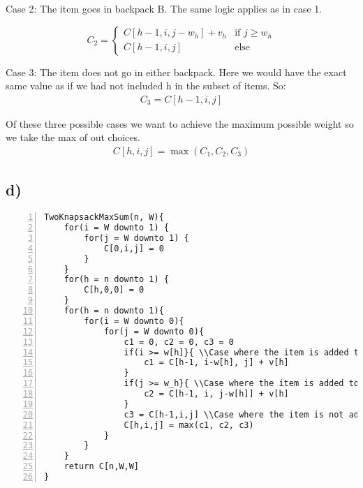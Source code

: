 \documentclass[12pt]{article}
\begin{document}
Case 2: The item goes in backpack B. The same logic applies as in case 1.
\begin{center}
\[
 C_2 =
  \begin{cases}
   C[h-1, i, j - w_h]  + v_h & \text{if } j \geq w_h \\
   C[h-1, i, j]       & \text{else}
  \end{cases}
\]
\end{center}

Case 3: The item does not go in either backpack. Here we would have the exact same value as if we had not included h in the subset of items. So:
\begin{eqnarray*}
    C_3 = C[h -1,i,j]
\end{eqnarray*}

Of these three possible cases we want to achieve the maximum possible weight so we take the max of out choices.
\begin{eqnarray*}
    C[h,i,j] = \max(C_1, C_2, C_3)
\end{eqnarray*}

\subsection*{d)}
\begin{Verbatim}[numbers=left]
TwoKnapsackMaxSum(n, W){
    for(i = W downto 1) {
        for(j = W downto 1) {
            C[0,i,j] = 0
        }
    }
    for(h = n downto 1) {
        C[h,0,0] = 0
    }
    for(h = n downto 1){
        for(i = W downto 0){
            for(j = W downto 0){
                c1 = 0, c2 = 0, c3 = 0
                if(i >= w[h]}{ \\Case where the item is added to A
                    c1 = C[h-1, i-w[h], j] + v[h]
                }
                if(j >= w_h}{ \\Case where the item is added to B
                    c2 = C[h-1, i, j-w[h]] + v[h]
                }
                c3 = C[h-1,i,j] \\Case where the item is not added
                C[h,i,j] = max(c1, c2, c3)
            }
        }
    }
    return C[n,W,W]
}
\end{Verbatim}
\end{document}
